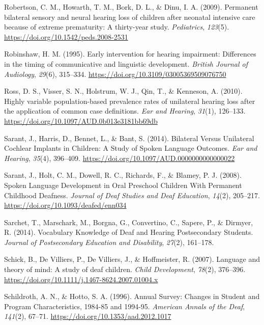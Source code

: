 \documentclass[english,man]{apa6}
\begin{document}
\leavevmode\hypertarget{ref-robertson2009}{}%
Robertson, C. M., Howarth, T. M., Bork, D. L., \& Dinu, I. A. (2009). Permanent bilateral sensory and neural hearing loss of children after neonatal intensive care because of extreme prematurity: A thirty-year study. \emph{Pediatrics}, \emph{123}(5). \url{https://doi.org/10.1542/peds.2008-2531}

\leavevmode\hypertarget{ref-robinshaw1995}{}%
Robinshaw, H. M. (1995). Early intervention for hearing impairment: Differences in the timing of communicative and linguistic development. \emph{British Journal of Audiology}, \emph{29}(6), 315--334. \url{https://doi.org/10.3109/03005369509076750}

\leavevmode\hypertarget{ref-ross2010}{}%
Ross, D. S., Visser, S. N., Holstrum, W. J., Qin, T., \& Kenneson, A. (2010). Highly variable population-based prevalence rates of unilateral hearing loss after the application of common case definitions. \emph{Ear and Hearing}, \emph{31}(1), 126--133. \url{https://doi.org/10.1097/AUD.0b013e3181bb69db}

\leavevmode\hypertarget{ref-sarant2014}{}%
Sarant, J., Harris, D., Bennet, L., \& Bant, S. (2014). Bilateral Versus Unilateral Cochlear Implants in Children: A Study of Spoken Language Outcomes. \emph{Ear and Hearing}, \emph{35}(4), 396--409. \url{https://doi.org/10.1097/AUD.0000000000000022}

\leavevmode\hypertarget{ref-sarant2008}{}%
Sarant, J., Holt, C. M., Dowell, R. C., Richards, F., \& Blamey, P. J. (2008). Spoken Language Development in Oral Preschool Children With Permanent Childhood Deafness. \emph{Journal of Deaf Studies and Deaf Education}, \emph{14}(2), 205--217. \url{https://doi.org/10.1093/deafed/enn034}

\leavevmode\hypertarget{ref-sarchet2014}{}%
Sarchet, T., Marschark, M., Borgna, G., Convertino, C., Sapere, P., \& Dirmyer, R. (2014). Vocabulary Knowledge of Deaf and Hearing Postsecondary Students. \emph{Journal of Postsecondary Education and Disability}, \emph{27}(2), 161--178.

\leavevmode\hypertarget{ref-schick2007}{}%
Schick, B., De Villiers, P., De Villiers, J., \& Hoffmeister, R. (2007). Language and theory of mind: A study of deaf children. \emph{Child Development}, \emph{78}(2), 376--396. \url{https://doi.org/10.1111/j.1467-8624.2007.01004.x}

\leavevmode\hypertarget{ref-schildroth1996}{}%
Schildroth, A. N., \& Hotto, S. A. (1996). Annual Survey: Changes in Student and Program Characteristics, 1984-85 and 1994-95. \emph{American Annals of the Deaf}, \emph{141}(2), 67--71. \url{https://doi.org/10.1353/aad.2012.1017}
\end{document}
